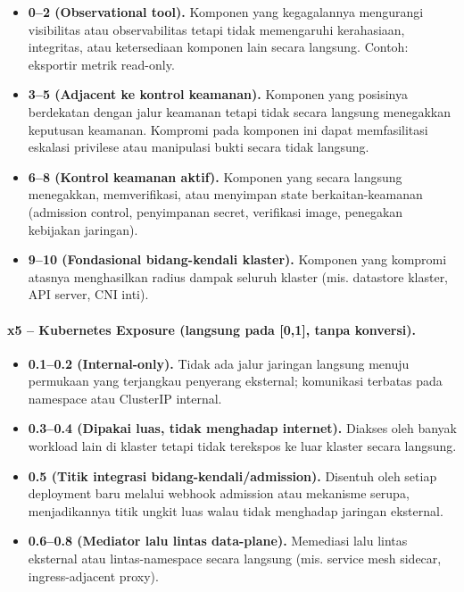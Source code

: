 \begin{itemize}
    \item \textbf{0--2 (Observational tool).} Komponen yang kegagalannya
    mengurangi visibilitas atau observabilitas tetapi tidak memengaruhi
    kerahasiaan, integritas, atau ketersediaan komponen lain secara
    langsung. Contoh: eksportir metrik read-only.

    \item \textbf{3--5 (Adjacent ke kontrol keamanan).} Komponen yang
    posisinya berdekatan dengan jalur keamanan tetapi tidak secara
    langsung menegakkan keputusan keamanan. Kompromi pada komponen ini
    dapat memfasilitasi eskalasi privilese atau manipulasi bukti secara
    tidak langsung.

    \item \textbf{6--8 (Kontrol keamanan aktif).} Komponen yang secara
    langsung menegakkan, memverifikasi, atau menyimpan state
    berkaitan-keamanan (admission control, penyimpanan secret,
    verifikasi image, penegakan kebijakan jaringan).

    \item \textbf{9--10 (Fondasional bidang-kendali klaster).}
    Komponen yang kompromi atasnya menghasilkan radius dampak
    seluruh klaster (mis. datastore klaster, API server, CNI inti).
\end{itemize}

\paragraph{x5 -- Kubernetes Exposure (langsung pada [0,1], tanpa konversi).}

\begin{itemize}
    \item \textbf{0.1--0.2 (Internal-only).} Tidak ada jalur jaringan
    langsung menuju permukaan yang terjangkau penyerang eksternal;
    komunikasi terbatas pada namespace atau ClusterIP internal.

    \item \textbf{0.3--0.4 (Dipakai luas, tidak menghadap internet).}
    Diakses oleh banyak workload lain di klaster tetapi tidak
    terekspos ke luar klaster secara langsung.

    \item \textbf{0.5 (Titik integrasi bidang-kendali/admission).}
    Disentuh oleh setiap deployment baru melalui webhook admission
    atau mekanisme serupa, menjadikannya titik ungkit luas walau
    tidak menghadap jaringan eksternal.

    \item \textbf{0.6--0.8 (Mediator lalu lintas data-plane).}
    Memediasi lalu lintas eksternal atau lintas-namespace secara
    langsung (mis. service mesh sidecar, ingress-adjacent proxy).
\end{itemize}

